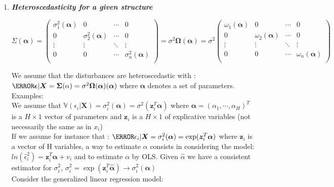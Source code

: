 \begin{enumerate}
	\item \textbf{\emph{Heteroscedasticity for a given structure}}\\
\begin{center}
\begin{equation*}
	\Sigma(\bm{\alpha})=
	\begin{pmatrix}
		\sigma_{1}^{2}(\bm{\alpha}) & 0 & \cdots & 0\\
		0 & \sigma_{2}^{2}(\bm{\alpha}) & \cdots & 0\\
		\vdots & \vdots & \ddots & \vdots\\
		0 & 0 & \cdots & \sigma_{n}^{2}(\bm{\alpha})\\
	\end{pmatrix}
	= \sigma^{2}\bm{\Omega}(\bm{\alpha})=\sigma^{2}
	\begin{pmatrix}
		\omega_{1}(\bm{\alpha}) & 0 & \cdots & 0\\
		0 & \omega_{2}(\bm{\alpha}) & \cdots & 0\\
		\vdots & \vdots & \ddots & \vdots\\
		0 & 0 & \cdots & \omega_{n}(\bm{\alpha})\\
	\end{pmatrix}
\end{equation*}
\end{center}
		We assume that the disturbances are heteroscedastic with :
		$\V{\bm{\epsilon}|\bm{X}}=\bm{\Sigma}(\alpha)=\sigma^{2}\bm{\Omega}(\bm{\alpha})(\bm{\alpha})$
		where $\bm{\alpha}$ denotes a set of parameters.\\
		Examples:\\
		We assume that $\mathbb{V}(\epsilon_{i}|\bm{X})=\sigma^{2}_{i}(\bm{\alpha})=
		\sigma^{2}\left(\bm{z}_{i}^{T}\bm{\alpha}\right)$ where $\bm{\alpha}=(\alpha_{1},
		\cdots, \alpha_{H})^{T}$ is a $H\times 1$ vector of parameters and $\bm{z}_{i}$
		is a $H\times 1$ of explicative variables (not necessarily the same as in $x_{i}$)
		\\ If we assume for instance that :
		$\V{\epsilon_{i}|\bm{X}}=\sigma_{i}^{2}(\bm{\alpha})=\exp(\bm{z}_{i}^{T}\bm{
		\alpha})$ where $\bm{z}_{i}$ is a vector of H variables, a way to estimate
		$\alpha$ consists in considering the model: $ln(\hat{\epsilon}_{i}^{2})=
		\bm{z}_{i}^{T}\bm{\alpha} + v_{i}$ and to estimate $\alpha$ by OLS. Given 
		$\hat{\alpha}$ we have a consistent estimator for $\sigma_{i}^{2}$, 
		$\sigma_{i}^{2} = \exp(\bm{z}_{i}^{T}\hat{\bm{\alpha}})\rightarrow\sigma_{i}^{2}(
		\bm{\alpha})$\\
		Consider the generalized linear regression model:\\

\end{enumerate}
